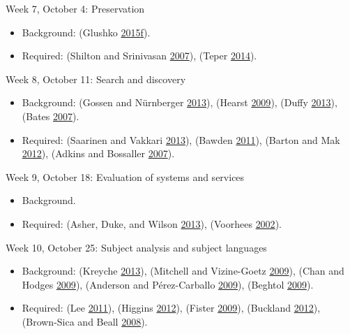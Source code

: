 \documentclass[]{article}
\providecommand{\tightlist}{%
  \setlength{\itemsep}{0pt}\setlength{\parskip}{0pt}}
\begin{document}
Week 7, October 4: Preservation

\begin{itemize}
\tightlist
\item
  Background: (Glushko
  \protect\hyperlink{ref-glushkoux5forganizingux5f2015}{2015}\protect\hyperlink{ref-glushkoux5forganizingux5f2015}{f}).
\item
  Required: (Shilton and Srinivasan
  \protect\hyperlink{ref-shiltonux5fparticipatoryux5f2007}{2007}),
  (Teper \protect\hyperlink{ref-teperux5fselectionux5f2014}{2014}).
\end{itemize}

Week 8, October 11: Search and discovery

\begin{itemize}
\tightlist
\item
  Background: (Gossen and Nürnberger
  \protect\hyperlink{ref-gossenux5fspecificsux5f2013}{2013}), (Hearst
  \protect\hyperlink{ref-hearstux5fevaluationux5f2009}{2009}), (Duffy
  \protect\hyperlink{ref-duffyux5fsearchingux5f2013}{2013}), (Bates
  \protect\hyperlink{ref-batesux5fwhatux5f2007}{2007}).
\item
  Required: (Saarinen and Vakkari
  \protect\hyperlink{ref-saarinenux5fsignux5f2013}{2013}), (Bawden
  \protect\hyperlink{ref-bawdenux5fencounteringux5f2011}{2011}), (Barton
  and Mak \protect\hyperlink{ref-bartonux5foldux5f2012}{2012}), (Adkins
  and Bossaller
  \protect\hyperlink{ref-adkinsux5ffictionux5f2007}{2007}).
\end{itemize}

Week 9, October 18: Evaluation of systems and services

\begin{itemize}
\tightlist
\item
  Background.
\item
  Required: (Asher, Duke, and Wilson
  \protect\hyperlink{ref-asherux5fpathsux5f2013}{2013}), (Voorhees
  \protect\hyperlink{ref-petersux5fphilosophyux5f2002}{2002}).
\end{itemize}

Week 10, October 25: Subject analysis and subject languages

\begin{itemize}
\tightlist
\item
  Background: (Kreyche
  \protect\hyperlink{ref-kreycheux5fsubjectux5f2013}{2013}), (Mitchell
  and Vizine-Goetz
  \protect\hyperlink{ref-mitchellux5fdeweyux5f2009}{2009}), (Chan and
  Hodges \protect\hyperlink{ref-chanux5flibraryux5f2009}{2009}),
  (Anderson and Pérez-Carballo
  \protect\hyperlink{ref-andersonux5flibraryux5f2009}{2009}), (Beghtol
  \protect\hyperlink{ref-beghtolux5fclassificationux5f2009}{2009}).
\item
  Required: (Lee
  \protect\hyperlink{ref-leeux5findigenousux5f2011}{2011}), (Higgins
  \protect\hyperlink{ref-higginsux5flibraryux5f2012}{2012}), (Fister
  \protect\hyperlink{ref-fisterux5fdeweyux5f2009}{2009}), (Buckland
  \protect\hyperlink{ref-bucklandux5fobsolescenceux5f2012}{2012}),
  (Brown-Sica and Beall
  \protect\hyperlink{ref-brown-sicaux5flibraryux5f2008}{2008}).
\end{itemize}
\end{document}
